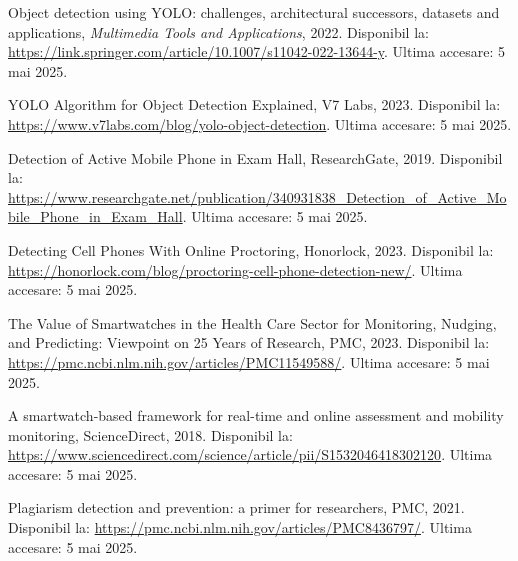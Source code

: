 \documentclass[12pt,a4paper]{article}
\begin{document}
\begin{thebibliography}{9}
Object detection using YOLO: challenges, architectural successors, datasets and applications,
\textit{Multimedia Tools and Applications},
2022.
Disponibil la: \url{https://link.springer.com/article/10.1007/s11042-022-13644-y}.
Ultima accesare: 5 mai 2025.

YOLO Algorithm for Object Detection Explained,
V7 Labs,
2023.
Disponibil la: \url{https://www.v7labs.com/blog/yolo-object-detection}.
Ultima accesare: 5 mai 2025.

Detection of Active Mobile Phone in Exam Hall,
ResearchGate,
2019.
Disponibil la: \url{https://www.researchgate.net/publication/340931838_Detection_of_Active_Mobile_Phone_in_Exam_Hall}.
Ultima accesare: 5 mai 2025.

Detecting Cell Phones With Online Proctoring,
Honorlock,
2023.
Disponibil la: \url{https://honorlock.com/blog/proctoring-cell-phone-detection-new/}.
Ultima accesare: 5 mai 2025.

The Value of Smartwatches in the Health Care Sector for Monitoring, Nudging, and Predicting: Viewpoint on 25 Years of Research,
PMC,
2023.
Disponibil la: \url{https://pmc.ncbi.nlm.nih.gov/articles/PMC11549588/}.
Ultima accesare: 5 mai 2025.

A smartwatch-based framework for real-time and online assessment and mobility monitoring,
ScienceDirect,
2018.
Disponibil la: \url{https://www.sciencedirect.com/science/article/pii/S1532046418302120}.
Ultima accesare: 5 mai 2025.

Plagiarism detection and prevention: a primer for researchers,
PMC,
2021.
Disponibil la: \url{https://pmc.ncbi.nlm.nih.gov/articles/PMC8436797/}.
Ultima accesare: 5 mai 2025.

\end{thebibliography}
\end{document}
